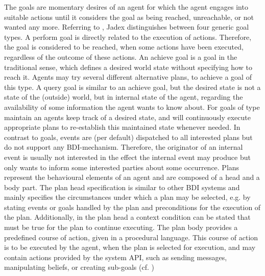 The goals are momentary desires of an agent for which the agent engages into suitable actions until it considers the goal as being reached, unreachable, or not wanted any more.
Referring to \cite{ActiveComponentsGoals}, Jadex distinguishes between four generic goal types. 
A perform goal is directly related to the execution of actions.
Therefore, the goal is considered to be reached, when some actions have been executed, regardless of the outcome of these actions.
An achieve goal is a goal in the traditional sense, which defines a desired world state without specifying how to reach it.
Agents may try several different alternative plans, to achieve a goal of this type.
A query goal is similar to an achieve goal, but the desired state is not a state of the (outside) world, but in internal state of the agent, regarding the availability of some information the agent wants to know about.
For goals of type maintain an agents keep track of a desired state, and will continuously execute appropriate plans to re-establish this maintained state whenever needed.
In contrast to goals, events are (per default) dispatched to all interested plans but do not support any BDI-mechanism.
Therefore, the originator of an internal event is usually not interested in the effect the internal event may produce but only wants to inform some interested parties about some occurrence.
Plans represent the behavioural elements of an agent and are composed of a head and a body part.
The plan head specification is similar to other BDI systems and mainly specifies the circumstances under which a plan may be selected, e.g. by stating events or goals handled by the plan and preconditions for the execution of the plan.
Additionally, in the plan head a context condition can be stated that must be true for the plan to continue executing.
The plan body provides a predefined course of action, given in a procedural language.
This course of action is to be executed by the agent, when the plan is selected for execution, and may contain actions provided by the system API, such as sending messages, manipulating beliefs, or creating sub-goals (cf. \cite{braubach_jadex_2004})

